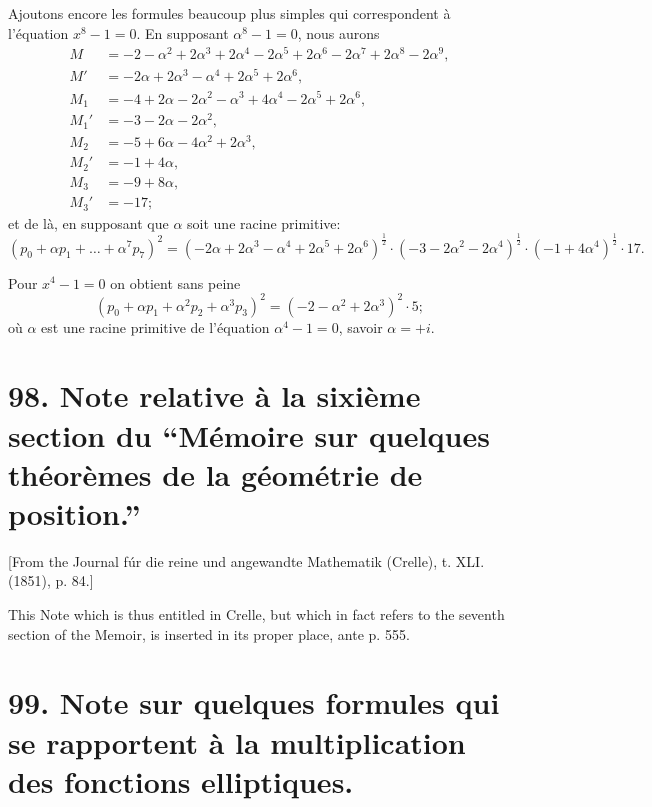 \documentclass[11pt,a4paper]{book}
\begin{document}
Ajoutons encore les formules beaucoup plus simples qui correspondent \`{a} l'\'{e}quation $x^8 - 1 = 0$. En supposant $\alpha^8 - 1 = 0$, nous aurons
\begin{align*}
M &= -2 - \alpha^2 + 2\alpha^3 + 2\alpha^4 - 2\alpha^5 + 2\alpha^6 - 2\alpha^7 + 2\alpha^8 - 2\alpha^9, \\
M' &= -2\alpha + 2\alpha^3 - \alpha^4 + 2\alpha^5 + 2\alpha^6, \\
M_1 &= -4 + 2\alpha - 2\alpha^2 - \alpha^3 + 4\alpha^4 - 2\alpha^5 + 2\alpha^6, \\
M_1' &= -3 - 2\alpha - 2\alpha^2, \\
M_2 &= -5 + 6\alpha - 4\alpha^2 + 2\alpha^3, \\
M_2' &= -1 + 4\alpha, \\
M_3 &= -9 + 8\alpha, \\
M_3' &= -17;
\end{align*}
et de l\`{a}, en supposant que $\alpha$ soit une racine primitive:
\[
(p_0 + \alpha p_1 + \ldots + \alpha^7 p_7)^2 = (-2\alpha + 2\alpha^3 - \alpha^4 + 2\alpha^5 + 2\alpha^6)^{\frac{1}{2}} \cdot (-3 - 2\alpha^2 - 2\alpha^4)^{\frac{1}{2}} \cdot (-1 + 4\alpha^4)^{\frac{1}{2}} \cdot 17.
\]

Pour $x^4 - 1 = 0$ on obtient sans peine
\[
(p_0 + \alpha p_1 + \alpha^2 p_2 + \alpha^3 p_3)^2 = (-2 - \alpha^2 + 2\alpha^3)^2 \cdot 5;
\]
o\`{u} $\alpha$ est une racine primitive de l'\'{e}quation $\alpha^4 - 1 = 0$, savoir $\alpha = +i$.

\newpage

\section*{98. Note relative \`{a} la sixi\`{e}me section du ``M\'{e}moire sur quelques th\'{e}or\`{e}mes de la g\'{e}om\'{e}trie de position.''}

[From the Journal f\'{u}r die reine und angewandte Mathematik (Crelle), t. XLI. (1851), p. 84.]

This Note which is thus entitled in Crelle, but which in fact refers to the seventh section of the Memoir, is inserted in its proper place, ante p. 555.

\newpage

\section*{99. Note sur quelques formules qui se rapportent \`{a} la multiplication des fonctions elliptiques.}
\end{document}
